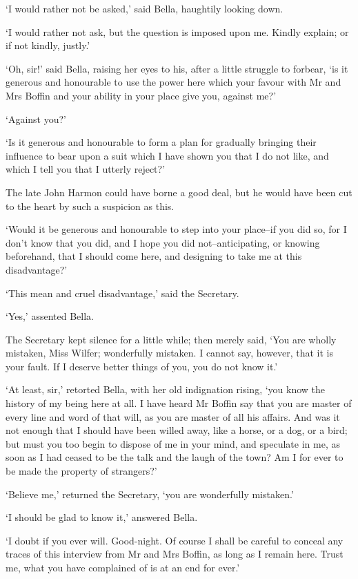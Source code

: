 ‘I would rather not be asked,’ said Bella, haughtily looking down.

‘I would rather not ask, but the question is imposed upon me. Kindly
explain; or if not kindly, justly.’

‘Oh, sir!’ said Bella, raising her eyes to his, after a little struggle
to forbear, ‘is it generous and honourable to use the power here which
your favour with Mr and Mrs Boffin and your ability in your place give
you, against me?’

‘Against you?’

‘Is it generous and honourable to form a plan for gradually bringing
their influence to bear upon a suit which I have shown you that I do not
like, and which I tell you that I utterly reject?’

The late John Harmon could have borne a good deal, but he would have
been cut to the heart by such a suspicion as this.

‘Would it be generous and honourable to step into your place--if you did
so, for I don’t know that you did, and I hope you did not--anticipating,
or knowing beforehand, that I should come here, and designing to take me
at this disadvantage?’

‘This mean and cruel disadvantage,’ said the Secretary.

‘Yes,’ assented Bella.

The Secretary kept silence for a little while; then merely said, ‘You
are wholly mistaken, Miss Wilfer; wonderfully mistaken. I cannot say,
however, that it is your fault. If I deserve better things of you, you
do not know it.’

‘At least, sir,’ retorted Bella, with her old indignation rising, ‘you
know the history of my being here at all. I have heard Mr Boffin say
that you are master of every line and word of that will, as you are
master of all his affairs. And was it not enough that I should have been
willed away, like a horse, or a dog, or a bird; but must you too begin
to dispose of me in your mind, and speculate in me, as soon as I had
ceased to be the talk and the laugh of the town? Am I for ever to be
made the property of strangers?’

‘Believe me,’ returned the Secretary, ‘you are wonderfully mistaken.’

‘I should be glad to know it,’ answered Bella.

‘I doubt if you ever will. Good-night. Of course I shall be careful to
conceal any traces of this interview from Mr and Mrs Boffin, as long as
I remain here. Trust me, what you have complained of is at an end for
ever.’


